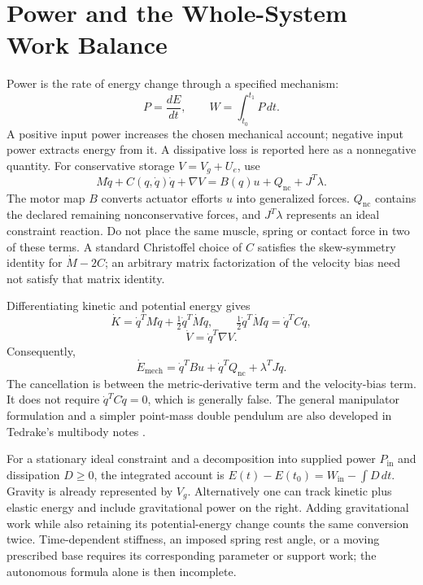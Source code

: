 \section{Power and the Whole-System Work Balance}
\label{sec:power_flow}

Power is the rate of energy change through a specified mechanism:
\begin{equation}
P=\frac{dE}{dt},\qquad W=\int_{t_0}^{t_1}P\,dt.
\label{eq:power_definition}
\end{equation}
A positive input power increases the chosen mechanical account; negative input
power extracts energy from it. A dissipative loss is reported here as a
nonnegative quantity. For conservative storage $V=V_g+U_e$, use
\begin{equation}
M\ddot q+C(q,\dot q)\dot q+\nabla V
 =B(q)u+Q_{\mathrm{nc}}+J^T\lambda.
\label{eq:power_decomposition}
\end{equation}
The motor map $B$ converts actuator efforts $u$ into generalized forces.
$Q_{\mathrm{nc}}$ contains the declared remaining nonconservative forces, and
$J^T\lambda$ represents an ideal constraint reaction. Do not place the same
muscle, spring or contact force in two of these terms. A standard Christoffel
choice of $C$ satisfies the skew-symmetry identity for $\dot M-2C$; an arbitrary
matrix factorization of the velocity bias need not satisfy that matrix identity.

Differentiating kinetic and potential energy gives
\begin{equation}
\dot K=\dot q^T M\ddot q+\tfrac12\dot q^T\dot M\dot q,
\qquad \tfrac12\dot q^T\dot M\dot q=\dot q^T C\dot q,
\label{eq:kinetic_energy_time_derivative}
\end{equation}
\begin{equation}
\dot V=\dot q^T\nabla V.
\label{eq:potential_energy_time_derivative}
\end{equation}
Consequently,
\begin{equation}
\dot E_{\mathrm{mech}}
 =\dot q^T Bu+\dot q^T Q_{\mathrm{nc}}+\lambda^T J\dot q.
\label{eq:power_balance}
\end{equation}
The cancellation is between the metric-derivative term and the velocity-bias
term. It does not require $\dot q^T C\dot q=0$, which is generally false.
The general manipulator formulation and a simpler point-mass double pendulum
are also developed in Tedrake's multibody notes \citep{TedrakeMultibodyEnergy}.

For a stationary ideal constraint and a decomposition into supplied power
$P_{\mathrm{in}}$ and dissipation $D\geq0$, the integrated account is
$E(t)-E(t_0)=W_{\mathrm{in}}-\int D\,dt$.
Gravity is already represented by $V_g$. Alternatively one can track kinetic
plus elastic energy and include gravitational power on the right. Adding
gravitational work while also retaining its potential-energy change counts the
same conversion twice. Time-dependent stiffness, an imposed spring rest angle,
or a moving prescribed base requires its corresponding parameter or support
work; the autonomous formula alone is then incomplete.


